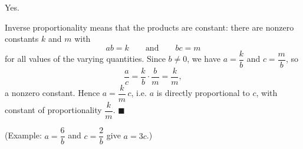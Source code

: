 Yes.

Inverse proportionality means that the products are constant: there are nonzero constants $k$ and $m$ with
\[ab=k\qquad\text{and}\qquad bc=m\]
for all values of the varying quantities. Since $b\ne0$, we have $a=\dfrac {k}{b}$ and $c=\dfrac {m}{b}$, so
\[\dfrac {a}{c}=\dfrac{k}{b}\cdot\dfrac{b}{m}=\dfrac {k}{m},\]
a nonzero constant. Hence $a=\dfrac {k}{m}\,c$, i.e. $a$ is directly proportional to $c$, with constant of proportionality $\dfrac {k}{m}$. $\blacksquare$

(Example: $a=\dfrac{6}{b}$ and $c=\dfrac{2}{b}$ give $a=3c$.)
